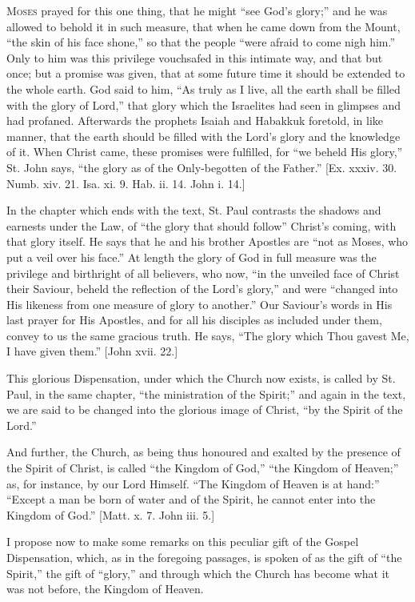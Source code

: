 M\textsc{oses} prayed for this one thing, that he might ``see God's
glory;'' and he was allowed to behold it in such measure, that
when he came down from the Mount, ``the skin of his face
shone,'' so that the people ``were afraid to come nigh
him.'' Only to him was this privilege vouchsafed in this intimate
way, and that but once; but a promise was given, that at some future
time it should be extended to the whole earth. God said to him,
``As truly as I live, all the earth shall be filled with the glory
of Lord,'' that glory which the Israelites had seen in glimpses
and had profaned. Afterwards the prophets Isaiah and Habakkuk
foretold, in like manner, that the earth should be filled with the
Lord's glory and the knowledge of it. When Christ came, these
promises were fulfilled, for ``we beheld His glory,'' St. John
says, ``the glory as of the Only-begotten of the Father.''
[Ex. xxxiv. 30. Numb. xiv. 21. Isa. xi. 9. Hab. ii. 14. John i. 14.]

In the chapter which ends with the text, St. Paul contrasts the
shadows and earnests under the Law, of ``the glory that should
follow'' Christ's coming, with that glory itself. He says that
he and his brother Apostles are ``not as Moses, who put a veil
over his face.'' At length the glory of God in full measure was
the privilege and birthright of all believers, who now, ``in the
unveiled face of Christ their Saviour, beheld the reflection of the
Lord's glory,'' and were ``changed into His likeness from
one measure of glory to another.'' Our Saviour's words in His
last prayer for His Apostles, and for all his disciples as included
under them, convey to us the same gracious truth. He says, ``The
glory which Thou gavest Me, I have given them.'' [John xvii. 22.]

This glorious Dispensation, under which the Church now exists, is
called by St. Paul, in the same chapter, ``the ministration of the
Spirit;'' and again in the text, we are said to be changed into
the glorious image of Christ, ``by the Spirit of the Lord.''

And further, the Church, as being thus honoured and exalted by the
presence of the Spirit of Christ, is called ``the Kingdom of
God,'' ``the Kingdom of Heaven;'' as, for instance, by our
Lord Himself. ``The Kingdom of Heaven is at hand:''
``Except a man be born of water and of the Spirit, he cannot enter
into the Kingdom of God.'' [Matt. x. 7. John iii. 5.]

I propose now to make some remarks on this peculiar gift of the
Gospel Dispensation, which, as in the foregoing passages, is spoken of
as the gift of ``the Spirit,'' the gift of ``glory,''
and through which the Church has become what it was not before, the
Kingdom of Heaven.


